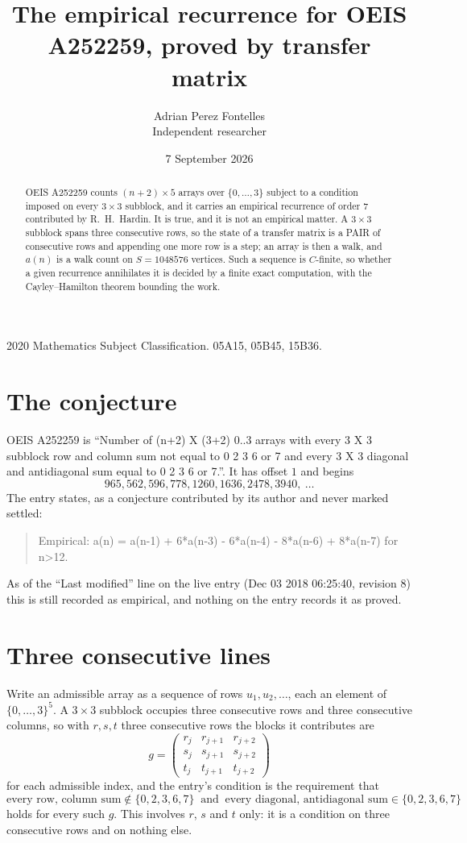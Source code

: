 \documentclass[11pt,a4paper]{article}
\title{The empirical recurrence for OEIS A252259, proved by transfer matrix}
\author{Adrian Perez Fontelles\\ \small Independent researcher}
\date{7 September 2026}
\theoremstyle{plain}
\theoremstyle{definition}
\begin{document}
\maketitle

\begin{abstract}
OEIS A252259 counts $(n+2)\times5$ arrays over $\{0,\dots,3\}$ subject to a condition imposed on
every $3\times3$ subblock, and it carries an empirical recurrence of order $7$
contributed by R.~H.~Hardin. It is true, and it is not an empirical matter. A $3\times3$
subblock spans three consecutive rows, so the state of a transfer matrix is a PAIR of
consecutive rows and appending one more row is a step; an array is then a walk, and
$a(n)$ is a walk count on $S=1048576$ vertices. Such a sequence is $C$-finite, so whether a given
recurrence annihilates it is decided by a finite exact computation, with the Cayley--Hamilton
theorem bounding the work.
\end{abstract}

\noindent\small 2020 Mathematics Subject Classification. 05A15, 05B45, 15B36.\normalsize

\section{The conjecture}

OEIS A252259 is ``Number of (n+2) X (3+2) 0..3 arrays with every 3 X 3 subblock row and column sum not equal to 0 2 3 6 or 7 and every 3 X 3 diagonal and antidiagonal sum equal to 0 2 3 6 or 7.''. It has offset $1$ and begins
\[
965, 562, 596, 778, 1260, 1636, 2478, 3940,\ \dots
\]
The entry states, as a conjecture contributed by its author and never marked settled:
\begin{quote}
Empirical: a(n) = a(n-1) + 6*a(n-3) - 6*a(n-4) - 8*a(n-6) + 8*a(n-7) for n>12.
\end{quote}
As of the ``Last modified'' line on the live entry (Dec 03 2018 06:25:40, revision 8) this is still
recorded as empirical, and nothing on the entry records it as proved.

\section{Three consecutive lines}

Write an admissible array as a sequence of rows $u_1,u_2,\dots$, each an element of
$\{0,\dots,3\}^{5}$. A $3\times3$ subblock occupies three consecutive rows and
three consecutive columns, so with $r,s,t$ three consecutive rows the blocks it
contributes are
\[
g=\begin{pmatrix}r_j&r_{j+1}&r_{j+2}\\ s_j&s_{j+1}&s_{j+2}\\ t_j&t_{j+1}&t_{j+2}\end{pmatrix}
\]
for each admissible index, and the entry's condition is the requirement that
\[
\text{every row, column sum} \notin \{0,2,3,6,7\}\ \text{ and }\ \text{every diagonal, antidiagonal sum} \in \{0,2,3,6,7\}
\]
holds for every such $g$. This involves $r$, $s$ and $t$ only: it is a condition on
three consecutive rows and on nothing else.
\end{document}
